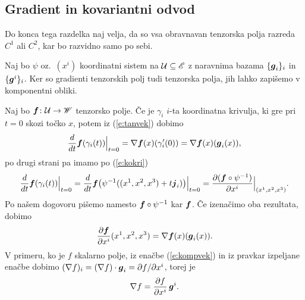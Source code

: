 \subsection{Gradient in kovariantni odvod}


Do konca tega razdelka naj velja, da so vsa obravnavan tenzorska polja razreda
$C^{1}$ ali $C^{2}$, kar bo razvidno samo po sebi.

Naj bo $\psi$ oz.~$(x^i)$ koordinatni sistem na $\mathcal U\subseteq\mathscr E$ z naravnima bazama $\{\boldsymbol g_i\}_i$ in $\{\boldsymbol g^i\}_i$.
Ker so gradienti tenzorskih polj tudi tenzorska polja, jih lahko zapišemo v komponentni obliki.

Naj bo $\boldsymbol f\colon \mathcal U\to\mathscr W$ tenzorsko polje. Če je $\gamma_i$ $i$-ta
koordinatna krivulja, ki gre pri $t=0$ skozi točko $x$, potem iz (\ref{e:tanvek}) dobimo
\begin{equation*}
	\frac{d}{dt}\boldsymbol f(\gamma_i(t))\Big|_{t=0}=
	\nabla \boldsymbol f(x)(\gamma_i'(0))=\nabla \boldsymbol f(x)(\boldsymbol g_i(x)),
\end{equation*}
po drugi strani pa imamo po (\ref{e:kokri})
\begin{equation*}
	\frac{d}{dt}\boldsymbol f(\gamma_i(t))\Big|_{t=0}=
	\frac{d}{dt}\boldsymbol f\big(\psi^{-1}((x^1,x^2,x^3)+t\boldsymbol j_i)\big)\Big|_{t=0}=
	\frac{\partial(\boldsymbol f\circ\psi^{-1})}{\partial x^i}\Big|_{(x^1,x^2,x^3)}.
\end{equation*}
Po našem dogovoru pišemo namesto $\boldsymbol f\circ\psi^{-1}$ kar $\boldsymbol f$. Če izenačimo oba rezultata, dobimo
\begin{equation} \label{e:sotf}
	\frac{\partial\boldsymbol f}{\partial x^i}(x^1,x^2,x^3)=\nabla \boldsymbol f(x)(\boldsymbol g_i(x)).
\end{equation}
V primeru, ko je $f$ skalarno polje, iz enačbe (\ref{e:kompvek}) in iz pravkar izpeljane enačbe
dobimo $(\nabla f)_i=(\nabla f)\cdot\boldsymbol g_i=\partial f/\partial x^i$, torej je
\begin{equation} \label{e:gradskal}
	\nabla f = \frac{\partial f}{\partial x^i}\,\boldsymbol g^i.
\end{equation}

